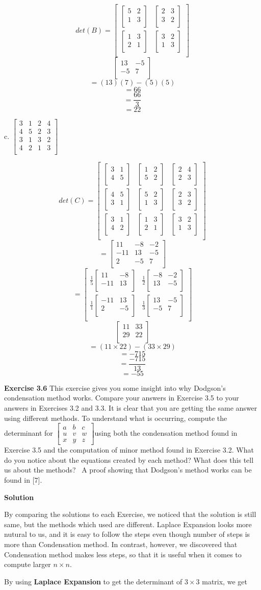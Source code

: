 \documentclass[12pt]{article}
\newcommand{\matxx}[2] {
\begin{bmatrix}
  #1 \\
  #2 \\
\end{bmatrix}
}
\newcommand{\matxxx}[3] {
\begin{bmatrix}
  #1 \\
  #2 \\
  #3 \\
\end{bmatrix}
}
\newcommand{\matxxxx}[4] {
\begin{bmatrix}
  #1 \\
  #2 \\
  #3 \\
  #4 \\
\end{bmatrix}
}
\begin{document}
\[
det(B) =
\matxx
	{\matxx{5&2}{1&3} & \matxx{2&3}{3&2}}
    {\matxx{1&3}{2&1} & \matxx{3&2}{1&3}}
\]
\[
\matxx{13 & -5}
		{-5 & 7}
\]
\[
=(13)(7) - (5)(5)
\]
\[=66\]
\[=\frac{66}{3}\]
\[=22\]

c.
\(
\matxxxx{3&1&2&4}
		{4&5&2&3}
		{3&1&3&2}
        {4&2&1&3}
\)

\[
det(C) =
\matxxx
	{\matxx{3&1}{4&5} & \matxx{1&2}{5&2} & \matxx{2&4}{2&3}}
    {\matxx{4&5}{3&1} & \matxx{5&2}{1&3} & \matxx{2&3}{3&2}}
    {\matxx{3&1}{4&2} & \matxx{1&3}{2&1} & \matxx{3&2}{1&3}}
\]
\[
=
\matxxx
	{11 & -8 & -2}
    {-11 & 13 & -5}
    {2 & -5 & 7}
\]
\[
=
\matxx
	{\frac{1}{5}\matxx{11&-8}{-11&13} & \frac{1}{2}\matxx{-8&-2}{13&-5}}
    {\frac{1}{1}\matxx{-11&13}{2&-5} & \frac{1}{3}\matxx{13&-5}{-5&7}} \]
\[
\matxx{11 & 33}{29 & 22}
\]
\[
=(11 \times 22) - (33 \times 29)
\]
\[
= - 715
\]
\[=\frac{-715}{13}\]
\[=-55\]

\bigskip

\noindent\textbf{Exercise 3.6} This exercise gives you some insight into why
Dodgson's condensation method works. Compare your answers in Exercise 3.5 to
your answers in Exercises 3.2 and 3.3. It is clear that you are getting the
same answer using different methods. To understand what is occurring, compute
the determinant for $%
\begin{bmatrix}
a & b & c \\
u & v & w \\
x & y & z
\end{bmatrix}
$using both the condensation method found in Exercise 3.5 and the computation
of minor method found in Exercise 3.2. What do you notice about the equations
created by each method? What does this tell us about the methods? \ A proof
showing that Dodgson's method works can be found in [7].

\bigskip

\textbf{Solution}

By comparing the solutions to each Exercise,
we noticed that the solution is still same,
but the methods which used are different.
Laplace Expansion looks more nutural to us,
and it is easy to follow the steps
even though number of steps is more than Condensation method.
In contrast, however, we discovered that Condensation method makes less steps,
so that it is useful when it comes to compute larger \(n \times n\).

\bigskip

By using \textbf{Laplace Expansion} to get the determinant of \(3 \times 3\) matrix, we get
\end{document}

